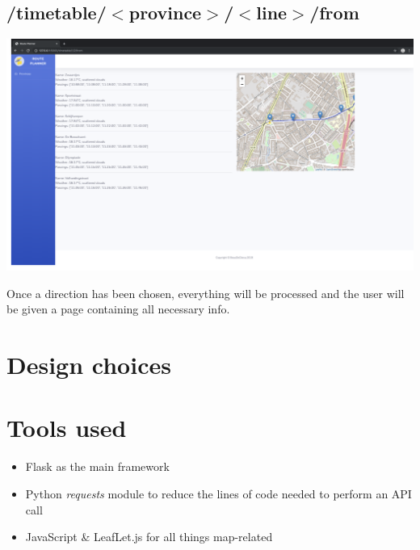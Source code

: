 \documentclass[12pt]{article}
\begin{document}
\subsection{/timetable/$<$province$>$/$<$line$>$/from}
\begin{center}
	\includegraphics[width=\linewidth]{images/Route_from.png}
\end{center}
Once a direction has been chosen, everything will be processed and  the user will be given a page containing all necessary info.

\newpage

\section{Design choices}


\newpage

\section{Tools used}
\begin{itemize}
	\item Flask as the main framework
	\item Python \emph{requests} module to reduce the lines of code needed to perform an API call
	\item JavaScript \& LeafLet.js for all things map-related

\end{itemize}
\end{document}
